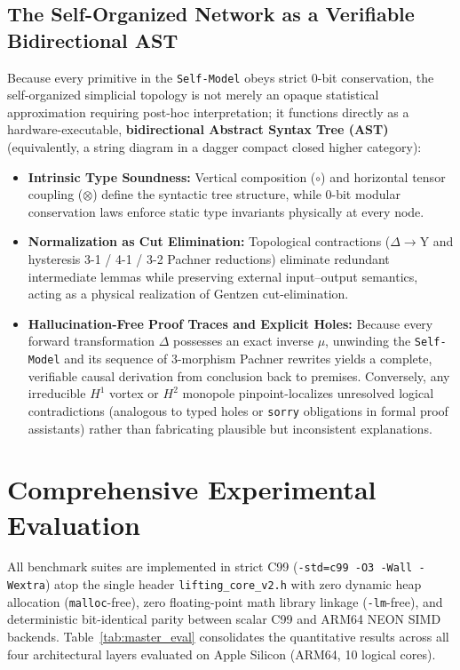 \documentclass[11pt, a4paper]{article}
\begin{document}
\subsection{The Self-Organized Network as a Verifiable Bidirectional AST}
Because every primitive in the \texttt{Self-Model} obeys strict 0-bit conservation, the self-organized simplicial topology is not merely an opaque statistical approximation requiring post-hoc interpretation; it functions directly as a hardware-executable, \textbf{bidirectional Abstract Syntax Tree (AST)} (equivalently, a string diagram in a dagger compact closed higher category):
\begin{itemize}
    \item \textbf{Intrinsic Type Soundness:} Vertical composition ($\circ$) and horizontal tensor coupling ($\otimes$) define the syntactic tree structure, while 0-bit modular conservation laws enforce static type invariants physically at every node.
    \item \textbf{Normalization as Cut Elimination:} Topological contractions ($\Delta \to \mathrm{Y}$ and hysteresis 3-1 / 4-1 / 3-2 Pachner reductions) eliminate redundant intermediate lemmas while preserving external input--output semantics, acting as a physical realization of Gentzen cut-elimination.
    \item \textbf{Hallucination-Free Proof Traces and Explicit Holes:} Because every forward transformation $\Delta$ possesses an exact inverse $\mu$, unwinding the \texttt{Self-Model} and its sequence of 3-morphism Pachner rewrites yields a complete, verifiable causal derivation from conclusion back to premises. Conversely, any irreducible $H^1$ vortex or $H^2$ monopole pinpoint-localizes unresolved logical contradictions (analogous to typed holes or \texttt{sorry} obligations in formal proof assistants) rather than fabricating plausible but inconsistent explanations.
\end{itemize}

\section{Comprehensive Experimental Evaluation}
\label{sec:evaluation}

All benchmark suites are implemented in strict C99 (\texttt{-std=c99 -O3 -Wall -Wextra}) atop the single header \texttt{lifting\_core\_v2.h} with zero dynamic heap allocation (\texttt{malloc}-free), zero floating-point math library linkage (\texttt{-lm}-free), and deterministic bit-identical parity between scalar C99 and ARM64 NEON SIMD backends. Table~\ref{tab:master_eval} consolidates the quantitative results across all four architectural layers evaluated on Apple Silicon (ARM64, 10 logical cores).
\end{document}
